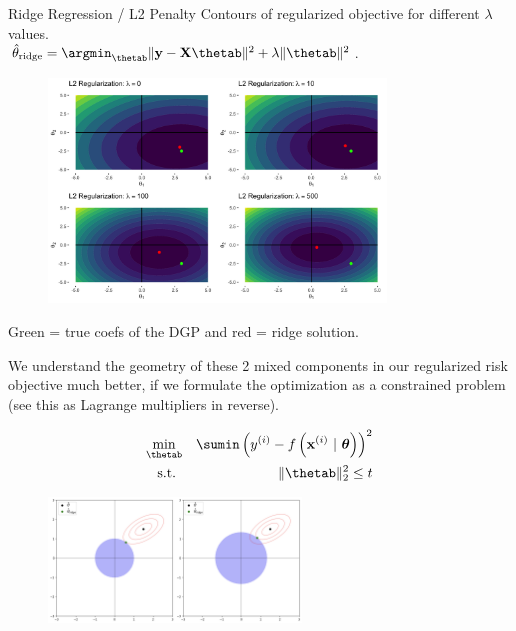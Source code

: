 \documentclass[11pt,compress,t,notes=noshow, xcolor=table]{beamer}
\begin{document}
\begin{vbframe}{Ridge Regression / L2 Penalty}
\framebreak 
Contours of regularized objective for different $\lambda$ values.\\
$ \thetah_{\text{ridge}} = \argmin_{\thetab} \|\yv - \Xmat \thetab\|^2 + \lambda \|\thetab\|^2 $.

\begin{figure}
\includegraphics[width=0.8\textwidth]{figure/ridge_contours.png}
\end{figure}
\vspace{-0.2cm}
Green  = true coefs of the DGP and red = ridge solution.

\framebreak

We understand the geometry of these 2 mixed components in our regularized risk objective much better, if we formulate the optimization as a constrained problem (see this as Lagrange multipliers in reverse).

\vspace{-0.5cm}

\begin{eqnarray*}
\min_{\thetab} && \sumin \left(\yi - \fxit\right)^2 \\
  \text{s.t. } && \|\thetab\|_2^2  \leq t \\
\end{eqnarray*}

\vspace{-1.0cm}

\begin{figure}
\includegraphics[width=0.6\textwidth]{figure/ridge_constraints.png}
\end{figure}


\end{vbframe}
\end{document}
